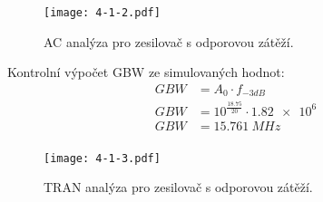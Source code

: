 
\begin{figure}[h!]
    \centering
    \texttt{[image: 4-1-2.pdf]}
    \caption{AC analýza pro zesilovač s odporovou zátěží.}
    \label{fig:2-2-pdf}
\end{figure}

Kontrolní výpočet GBW ze simulovaných hodnot:
\begin{align*}
    GBW &= A_{0}\cdot f_{-3dB} \\
    GBW &= 10^{\frac{\num{18.75}}{20}}\cdot \num{1.82e6} \\
    GBW &= \qty{15.761}{MHz}\\
\end{align*}

\begin{figure}[h!]
    \centering
    \texttt{[image: 4-1-3.pdf]}
    \caption{TRAN analýza pro zesilovač s odporovou zátěží.}
    \label{fig:2-2-pdf}
\end{figure}

